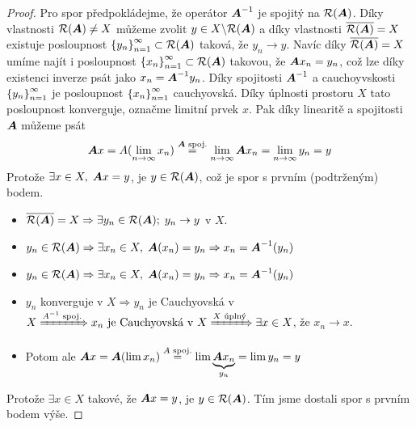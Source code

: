 \begin{proof}
    Pro spor předpokládejme, že operátor $\boldsymbol{A}^{-1}$ je spojitý na $\mathcal{R}(\boldsymbol{A})$. Díky vlastnosti $\mathcal{R}(\boldsymbol{A}) \neq X$ můžeme zvolit $y\in X\backslash \mathcal{R}(\boldsymbol{A}) $ a díky vlastnosti $\overline{\mathcal{R}(\boldsymbol{A})}=X$ existuje posloupnost $\left \lbrace y_n \right \rbrace_{n=1}^\infty \subset \mathcal{R}(\boldsymbol{A})$ taková, že $y_n \rightarrow y$. Navíc díky $\overline{\mathcal{R}(\boldsymbol{A})}=X$ umíme najít i posloupnost $\left \lbrace x_n \right \rbrace_{n=1}^\infty \subset \mathcal{R}(\boldsymbol{A})$ takovou, že $\boldsymbol{A} x_n = y_n$, což lze díky existenci inverze psát jako $x_n = \boldsymbol{A}^{-1} y_n$. Díky spojitosti $\boldsymbol{A}^{-1}$ a cauchoyvskosti $\left \lbrace y_n \right \rbrace_{n=1}^\infty$ je posloupnost $\left \lbrace x_n \right \rbrace_{n=1}^\infty$ cauchyovská. Díky úplnosti prostoru $X$ tato posloupnost konverguje, označme limitní prvek $x$. Pak díky linearitě a spojitosti $\boldsymbol{A}$ můžeme psát \begin{align*}
        \boldsymbol{A}x=A(\lim\limits_{n\rightarrow \infty} x_n)\overset{\boldsymbol{A} \text{ spoj.}}{=} \lim\limits_{n\rightarrow \infty} \boldsymbol{A} x_n = \lim\limits_{n\rightarrow \infty} y_n= y
    \end{align*}
    Protože $\exists x\in X,\; \boldsymbol{A}x=y$, je $y\in\mathcal{R}(\boldsymbol{A})$, což je spor s prvním (podtrženým) bodem.
    
    \begin{itemize}
        \item $\overline{\mathcal{R}(\boldsymbol{A})}=X \Rightarrow \exists y_n\in\mathcal{R}(\boldsymbol{A});\; y_n\rightarrow y$ v $X$.
        \item $y_n\in\mathcal{R}(\boldsymbol{A}) \Rightarrow \exists x_n\in X, \;\boldsymbol{A}(x_n)=y_n \Rightarrow x_n=\boldsymbol{A}^{-1}(y_n)$
       \item $y_n\in\mathcal{R}(\boldsymbol{A})\Rightarrow \exists x_n\in X,\; \boldsymbol{A}(x_n)=y_n \Rightarrow x_n=\boldsymbol{A}^{-1}(y_n)$
        \item $y_n$ konverguje v $X \Rightarrow y_n$ je Cauchyovská v $X \xRightarrow{A^{-1} \text{ spoj.}} x_n \text{ je Cauchyovská v } X \xRightarrow{X \text{ úplný}} \exists x\in X$, že  $x_n\rightarrow x$.
        \item Potom ale $\boldsymbol{A} x = \boldsymbol{A}(\lim x_n)\overset{A \text{ spoj.}}{\;\;=\;\;} \lim \underbrace{\boldsymbol{A} x_n}_{y_n} = \lim y_n = y$
    \end{itemize}
Protože $\exists x\in X$ takové, že $\boldsymbol{A} x=y$, je $y\in\mathcal{R}(\boldsymbol{A})$. Tím jsme dostali spor s prvním bodem výše.
\end{proof}

